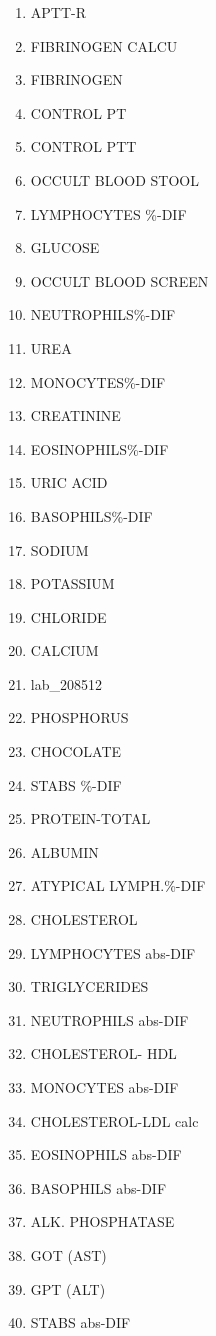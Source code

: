 \documentclass[a4paper,12pt]{article}
\begin{document}
\begin{appendices}
\begin{enumerate}
   			\item APTT-R
   			\item FIBRINOGEN CALCU
   			\item FIBRINOGEN
   			\item CONTROL PT
   			\item CONTROL PTT
   			\item OCCULT BLOOD STOOL
   			\item LYMPHOCYTES \%-DIF
   			\item GLUCOSE
   			\item OCCULT BLOOD SCREEN
   			\item NEUTROPHILS\%-DIF
   			\item UREA
   			\item MONOCYTES\%-DIF
   			\item CREATININE
   			\item EOSINOPHILS\%-DIF
   			\item URIC ACID
   			\item BASOPHILS\%-DIF
   			\item SODIUM
   			\item POTASSIUM
   			\item CHLORIDE
   			\item CALCIUM
   			\item lab\_208512
   			\item PHOSPHORUS
   			\item CHOCOLATE
   			\item STABS \%-DIF
   			\item PROTEIN-TOTAL
   			\item ALBUMIN
   			\item ATYPICAL LYMPH.\%-DIF
   			\item CHOLESTEROL
   			\item LYMPHOCYTES abs-DIF
   			\item TRIGLYCERIDES
   			\item NEUTROPHILS abs-DIF
   			\item CHOLESTEROL- HDL
   			\item MONOCYTES abs-DIF
   			\item CHOLESTEROL-LDL calc
   			\item EOSINOPHILS abs-DIF
   			\item BASOPHILS abs-DIF
   			\item ALK. PHOSPHATASE
   			\item GOT (AST)
   			\item GPT (ALT)
   			\item STABS abs-DIF

\end{enumerate}
\end{appendices}
\end{document}
